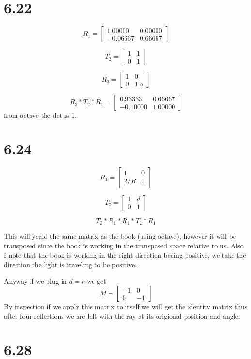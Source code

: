 \documentclass[12pt,a4paper]{article}
\begin{document}
\section{6.22}
$$
R_1=
\begin{bmatrix}
1.00000&   0.00000\\
-0.06667&   0.66667
\end{bmatrix}$$

$$
T_2=
\begin{bmatrix}
1&   1\\
0&   1
\end{bmatrix}$$

$$
R_3=
\begin{bmatrix}
1&   0\\
0 &  1.5
\end{bmatrix}$$

$$
R_3*T_2*R_1=
\begin{bmatrix}
0.93333&   0.66667\\
-0.10000&   1.00000
\end{bmatrix}$$
from octave the det is 1.
\section{6.24}
$$
R_1=
\begin{bmatrix}
1&   0\\
2/R&   1
\end{bmatrix}$$

$$
T_2=
\begin{bmatrix}
1&   d\\
0&   1
\end{bmatrix}$$



$$T_2*R_1*R_1*T_2*R_1$$

This will yeald the same matrix as the book (using octave), however it will be transposed since the book is working in the transposed space relative to us.  Also I note that the book is working in the right direction beeing positive, we take the direction the light is traveling to be positive.

Anyway if we plug in $d=r$ we get 
$$
M=
\begin{bmatrix}
-1&   0\\
0&-1
\end{bmatrix}$$
By inspection if we apply this matrix to itself we will get the identity matrix thus after four reflections we are left with the ray at its origional position and angle.
\section{6.28}
\end{document}
